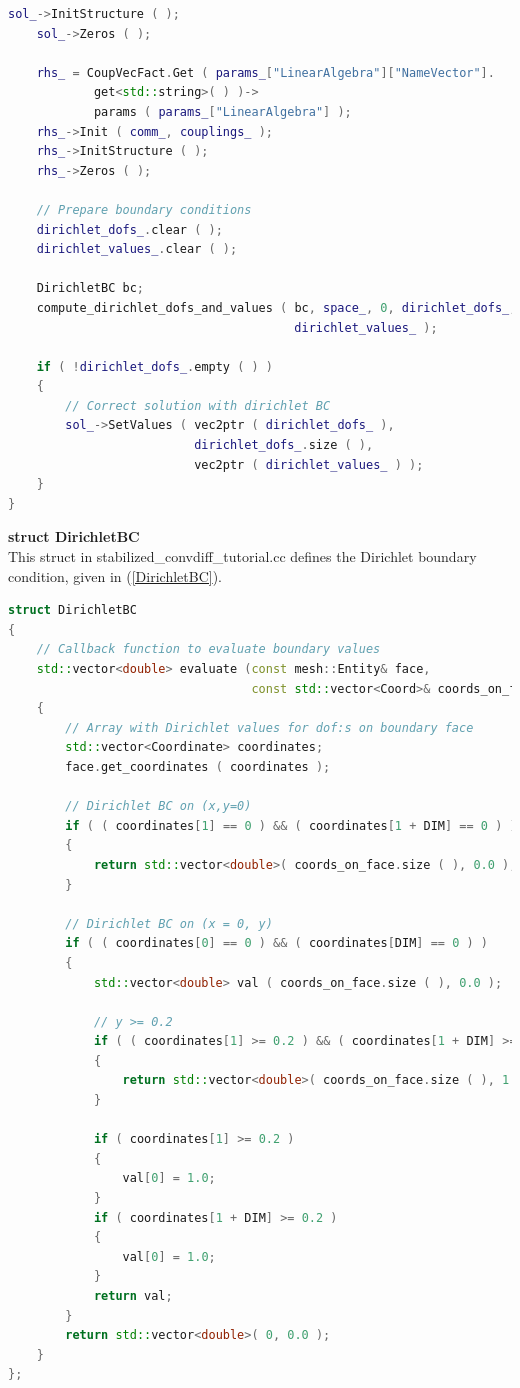 \documentclass[a4paper, 11pt, twoside]{article}
\begin{document}
\begin{lstlisting}[language=C++, basicstyle={\footnotesize, \ttfamily}, keywordstyle=\color{blue}, numbers=none, tabsize=4]
    sol_->InitStructure ( );
    sol_->Zeros ( );

    rhs_ = CoupVecFact.Get ( params_["LinearAlgebra"]["NameVector"].
            get<std::string>( ) )->
            params ( params_["LinearAlgebra"] );
    rhs_->Init ( comm_, couplings_ );
    rhs_->InitStructure ( );
    rhs_->Zeros ( );

    // Prepare boundary conditions
    dirichlet_dofs_.clear ( );
    dirichlet_values_.clear ( );

    DirichletBC bc;
    compute_dirichlet_dofs_and_values ( bc, space_, 0, dirichlet_dofs_,
                                        dirichlet_values_ );

    if ( !dirichlet_dofs_.empty ( ) )
    {
        // Correct solution with dirichlet BC
        sol_->SetValues ( vec2ptr ( dirichlet_dofs_ ), 
                          dirichlet_dofs_.size ( ),
                          vec2ptr ( dirichlet_values_ ) );
    }
}
\end{lstlisting}

\textbf{struct DirichletBC} \label{structDirichletBC}\\
This struct in stabilized\_convdiff\_tutorial.cc defines the Dirichlet boundary condition, given in (\ref{DirichletBC}).
\begin{lstlisting}[language=C++, basicstyle={\footnotesize, \ttfamily}, keywordstyle=\color{blue}, numbers=none, tabsize=4]
struct DirichletBC
{
    // Callback function to evaluate boundary values
    std::vector<double> evaluate (const mesh::Entity& face,
                                  const std::vector<Coord>& coords_on_face) const
    {
        // Array with Dirichlet values for dof:s on boundary face
        std::vector<Coordinate> coordinates;
        face.get_coordinates ( coordinates );

        // Dirichlet BC on (x,y=0)
        if ( ( coordinates[1] == 0 ) && ( coordinates[1 + DIM] == 0 ) )
        {
            return std::vector<double>( coords_on_face.size ( ), 0.0 );
        }

        // Dirichlet BC on (x = 0, y)
        if ( ( coordinates[0] == 0 ) && ( coordinates[DIM] == 0 ) )
        {
            std::vector<double> val ( coords_on_face.size ( ), 0.0 );

            // y >= 0.2
            if ( ( coordinates[1] >= 0.2 ) && ( coordinates[1 + DIM] >= 0.2 ) )
            {
                return std::vector<double>( coords_on_face.size ( ), 1.0 );
            }

            if ( coordinates[1] >= 0.2 )
            {
                val[0] = 1.0;
            }
            if ( coordinates[1 + DIM] >= 0.2 )
            {
                val[0] = 1.0;
            }
            return val;
        }
        return std::vector<double>( 0, 0.0 );
    }
};
\end{lstlisting}
\end{document}
